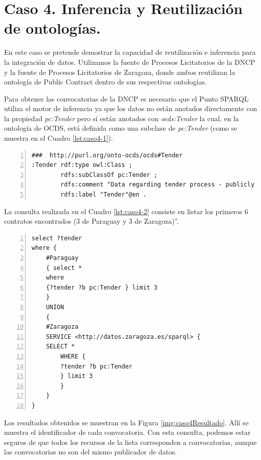 \section{Caso 4. Inferencia y Reutilización de ontologías. }

En este caso se pretende demostrar la capacidad de reutilización e inferencia para la integración de datos. Utilizamos la fuente de Procesos Licitatorios de la DNCP y la fuente de Procesos Licitatorios de Zaragoza, donde ambos reutilizan la ontología de Public Contract dentro de sus respectivas ontologías.

Para obtener las convocatorias de la DNCP es necesario que el Punto SPARQL utiliza el motor de inferencia ya que los datos no están anotados directamente con la propiedad \textit{pc:Tender} pero sí están anotados con \textit{ocds:Tender} la cual, en la ontología de OCDS, está definida como una subclase de \textit{pc:Tender} (como se muestra en el Cuadro \ref{lst:caso4-1}). \hfill \break

\noindent\begin{minipage}[c]{\textwidth}
\begin{lstlisting}[captionpos=b, caption=Extension de la ontologia reutilizando PC, label={lst:caso4-1},  numbers=left,  numberstyle=\tiny\color{mygray},
    basicstyle=\footnotesize\ttfamily,frame=single]
###  http://purl.org/onto-ocds/ocds#Tender
:Tender rdf:type owl:Class ;
        rdfs:subClassOf pc:Tender ;
        rdfs:comment "Data regarding tender process - publicly inviting prospective contractors to submit bids for evaluation and selecting a winner or winners"@en ;
        rdfs:label "Tender"@en .
 \end{lstlisting}
\end{minipage}
 

 La consulta realizada en el Cuadro \ref{lst:caso4-2} consiste en listar los primeros 6 contratos encontrados (3 de Paraguay y 3 de Zaragoza)”.
 
\noindent\begin{minipage}[c]{\textwidth}
 \begin{lstlisting}[captionpos=b, caption=Consulta a dos fuentes de datos utilizando el mismo concepto, label={lst:caso4-2},  numbers=left,  numberstyle=\tiny\color{mygray},
    basicstyle=\footnotesize\ttfamily,frame=single]
select ?tender
where {
    #Paraguay
    { select * 
    where 
    {?tender ?b pc:Tender } limit 3 
    }
    UNION 
    { 
    #Zaragoza
    SERVICE <http://datos.zaragoza.es/sparql> {
    SELECT * 
        WHERE {
        ?tender ?b pc:Tender 
        } limit 3
        }
    }
}
 \end{lstlisting}
\end{minipage}
 Los resultados obtenidos se muestran en la Figura \ref{img:caso4Resultado}. Allí se muestra el identificador de cada convocatoria. Con esta consulta, podemos estar seguros de que todos los recursos de la lista corresponden a convocatorias, aunque las convocatorias no son del mismo publicador de datos.



